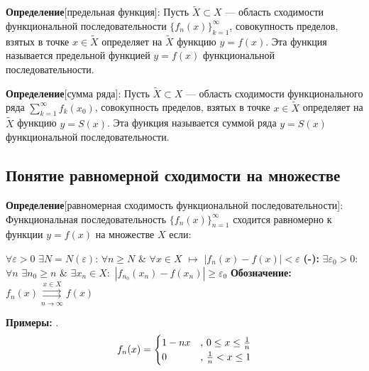 \documentclass[a4paper,12pt]{article} %
\begin{document}
\noindent \textbf{Определение}[предельная функция]:\newline
Пусть $\widetilde{X} \subset X$ ---  область сходимости функциональной последовательности $\{f_n(x)\}_{k=1}^\infty$, совокупность пределов, взятых в точке $x\in \widetilde{X}$ определяет на $\widetilde{X}$ функцию $y = f(x)$. Эта функция называется предельной функцией $y = f(x) $ функциональной последовательности. \newline

\noindent \textbf{Определение}[сумма ряда]:\newline
Пусть $\widetilde{X} \subset X$ ---  область сходимости функционального ряда  $\sum\limits_{k = 1}^{\infty}  f_k(x_0)$, совокупность пределов, взятых в точке $x\in \widetilde{X}$ определяет на $\widetilde{X}$ функцию $y = S(x)$. Эта функция называется суммой ряда  $y = S(x) $ функциональной последовательности.


\subsection{Понятие равномерной сходимости на множестве}

\noindent \textbf{Определение}[равномерная сходимость функциональной последовательности]:\newline
Функциональная последовательность $\{f_n(x)\}_{n=1}^\infty$ сходится равномерно к функции $y=f(x)$ на множестве $X$ если: \newline \newline

$\forall \varepsilon > 0 $  $\exists N = N(\varepsilon)$: $\forall n \geq N$  $\&$  $\forall x \in X$ $\longmapsto$ $|f_n(x) -f(x)| < \varepsilon$
\newline \newline
\hspace*{5mm} \noindent \textbf{(-):} $\exists \varepsilon_0>0:$ $\forall n$  $\exists n_0 \geq n$  $\&$  $\exists x_n \in X:$ $|f_{n_0}(x_n)-f(x_n)| \geq \varepsilon_0$ 
\newline \newline
\noindent \textbf{Обозначение:} $f_n(x) \overset{x \in X}{\underset{n \rightarrow \infty}{\rightrightarrows}} f(x)$

\noindent \textbf{Примеры:} .
\begin{equation*}
f_n(x) = 
 \begin{cases}
   1-nx &\text{, $0 \leq x \leq {1 \over n}$}\\
   0 &\text{, ${1\over n}< x\leq 1$}
 \end{cases}
\end{equation*}
\end{document}
